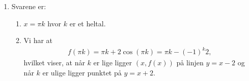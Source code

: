 \begin{enumerate}
	
	\item\label{it:diff13ans} Svarene er: 
	\begin{enumerate}
		\item $x=\pi k$ hvor $k$ er et heltal.
		\item Vi har at 
	\begin{align*}
	f(\pi k)=\pi k+2\cos(\pi k)=\pi k-(-1)^k 2,
	\end{align*}
	hvilket viser, at når $k$ er lige ligger $(x,f(x)) $ på linjen $y=x-2$ og når $k$ er ulige ligger punktet på $y=x+2$.
	\end{enumerate}
	

\end{enumerate}
